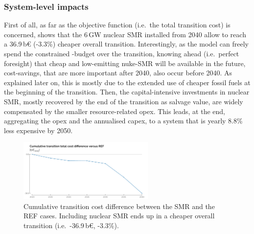 \documentclass[11pt,twoside,a4paper,english]{article}
\def\ie{i.e.\ }
\begin{document}
\subsubsection{System-level impacts}
\label{subsubsec:results_deter_overall}
First of all, as far as the objective function (\ie the total transition cost) is concerned,  shows that the 6\,GW nuclear SMR installed from 2040 allow to reach a 36.9\,b€ (-3.3\%) cheaper overall transition. Interestingly, as the model can freely spend the constrained -budget over the transition, knowing ahead (\ie perfect foresight) that cheap and low-emitting nuke-SMR will be available in the future, cost-savings, that are more important after 2040, also occur before 2040. As explained later on, this is mostly due to the extended use of cheaper fossil fuels at the beginning of the transition. Then, the capital-intensive investments in nuclear SMR, mostly recovered by the end of the transition as salvage value, are widely compensated by the smaller resource-related opex. This leads, at the end, aggregating the opex and the annualised capex, to a system that is yearly 8.8\% less expensive by 2050.

\begin{figure}[!htbp]
\centering
\includegraphics[width=0.6\textwidth]{figures/Cum_total_cost_diff_REF.pdf}
\caption{Cumulative transition cost difference between the SMR and the REF cases. Including nuclear SMR ends up in a cheaper overall transition (\ie -36.9\,b€, -3.3\%).}
\label{fig:results_deter_overall_cost}
\end{figure}
\end{document}
